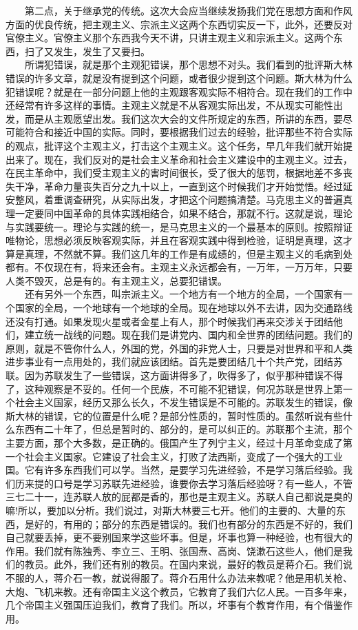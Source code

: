 \documentclass[cn,11pt,chinese]{elegantbook}
\begin{document}
　　第二点，关于继承党的传统。这次大会应当继续发扬我们党在思想方面和作风方面的优良传统，把主观主义、宗派主义这两个东西切实反一下，此外，还要反对官僚主义。官僚主义那个东西我今天不讲，只讲主观主义和宗派主义。这两个东西，扫了又发生，发生了又要扫。\\
　　所谓犯错误，就是那个主观犯错误，那个思想不对头。我们看到的批评斯大林错误的许多文章，就是没有提到这个问题，或者很少提到这个问题。斯大林为什么犯错误呢？就是在一部分问题上他的主观跟客观实际不相符合。现在我们的工作中还经常有许多这样的事情。主观主义就是不从客观实际出发，不从现实可能性出发，而是从主观愿望出发。我们这次大会的文件所规定的东西，所讲的东西，要尽可能符合和接近中国的实际。同时，要根据我们过去的经验，批评那些不符合实际的观点，批评这个主观主义，打击这个主观主义。这个任务，早几年我们就开始提出来了。现在，我们反对的是社会主义革命和社会主义建设中的主观主义。过去，在民主革命中，我们受主观主义的害时间很长，受了很大的惩罚，根据地差不多丧失干净，革命力量丧失百分之九十以上，一直到这个时候我们才开始觉悟。经过延安整风，着重调查研究，从实际出发，才把这个问题搞清楚。马克思主义的普遍真理一定要同中国革命的具体实践相结合，如果不结合，那就不行。这就是说，理论与实践要统一。理论与实践的统一，是马克思主义的一个最基本的原则。按照辩证唯物论，思想必须反映客观实际，并且在客观实践中得到检验，证明是真理，这才算是真理，不然就不算。我们这几年的工作是有成绩的，但是主观主义的毛病到处都有。不仅现在有，将来还会有。主观主义永远都会有，一万年，一万万年，只要人类不毁灭，总是有的。有主观主义，总要犯错误。\\
　　还有另外一个东西，叫宗派主义。一个地方有一个地方的全局，一个国家有一个国家的全局，一个地球有一个地球的全局。现在地球以外不去讲，因为交通路线还没有打通。如果发现火星或者金星上有人，那个时候我们再来交涉关于团结他们，建立统一战线的问题。现在我们是讲党内、国内和全世界的团结问题。我们的原则，就是不管你什么人，外国的党，外国的非党人士，只要是对世界和平和人类进步事业有一点用处的，我们就应该团结。首先是要团结几十个共产党，团结苏联。因为苏联发生了一些错误，这方面讲得多了，吹得多了，似乎那种错误不得了，这种观察是不妥的。任何一个民族，不可能不犯错误，何况苏联是世界上第一个社会主义国家，经历又那么长久，不发生错误是不可能的。苏联发生的错误，像斯大林的错误，它的位置是什么呢？是部分性质的，暂时性质的。虽然听说有些什么东西有二十年了，但总是暂时的、部分的，是可以纠正的。苏联那个主流，那个主要方面，那个大多数，是正确的。俄国产生了列宁主义，经过十月革命变成了第一个社会主义国家。它建设了社会主义，打败了法西斯，变成了一个强大的工业国。它有许多东西我们可以学。当然，是要学习先进经验，不是学习落后经验。我们历来提的口号是学习苏联先进经验，谁要你去学习落后经验呀？有一些人，不管三七二十一，连苏联人放的屁都是香的，那也是主观主义。苏联人自己都说是臭的嘛!所以，要加以分析。我们说过，对斯大林要三七开。他们的主要的、大量的东西，是好的，有用的；部分的东西是错误的。我们也有部分的东西是不好的，我们自己就要丢掉，更不要别国来学这些坏事。但是，坏事也算一种经验，也有很大的作用。我们就有陈独秀、李立三、王明、张国焘、高岗、饶漱石这些人，他们是我们的教员。此外，我们还有别的教员。在国内来说，最好的教员是蒋介石。我们说不服的人，蒋介石一教，就说得服了。蒋介石用什么办法来教呢？他是用机关枪、大炮、飞机来教。还有帝国主义这个教员，它教育了我们六亿人民。一百多年来，几个帝国主义强国压迫我们，教育了我们。所以，坏事有个教育作用，有个借鉴作用。\\
\end{document}
